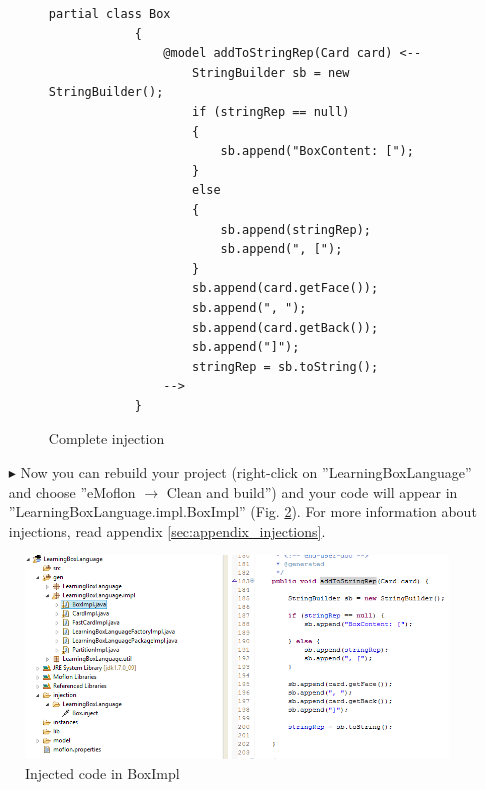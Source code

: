 \begin{enumerate}
    \begin{figure}[htbp]
        \centering
        \begin{lstlisting}[language=Injection]
            partial class Box
            {
                @model addToStringRep(Card card) <--
                    StringBuilder sb = new StringBuilder();
                    if (stringRep == null)
                    {
                        sb.append("BoxContent: [");
                    }
                    else
                    {
                        sb.append(stringRep);
                        sb.append(", [");
                    }
                    sb.append(card.getFace());
                    sb.append(", ");
                    sb.append(card.getBack());
                    sb.append("]");
                    stringRep = sb.toString();
                -->
            }
        \end{lstlisting}
        \caption{Complete injection}
        \label{code:complete_inject_file}
    \end{figure}
    \FloatBarrier
    \item[$\blacktriangleright$] Now you can rebuild your project (right-click on ''LearningBoxLanguage'' and choose ''eMoflon $\rightarrow$ Clean and build'') and your code will appear in ''LearningBoxLanguage.impl.BoxImpl'' (Fig. \ref{fig:injected_code_in_boxImpl}). For more information about injections, read appendix \ref{sec:appendix_injections}.

\end{enumerate}

    

    \begin{figure}[htbp]
        \centering
        \includegraphics[width=\textwidth]{pics/injectionBilder/injected_code_in_impl.png}
        \caption{Injected code in BoxImpl}
        \label{fig:injected_code_in_boxImpl}
    \end{figure}